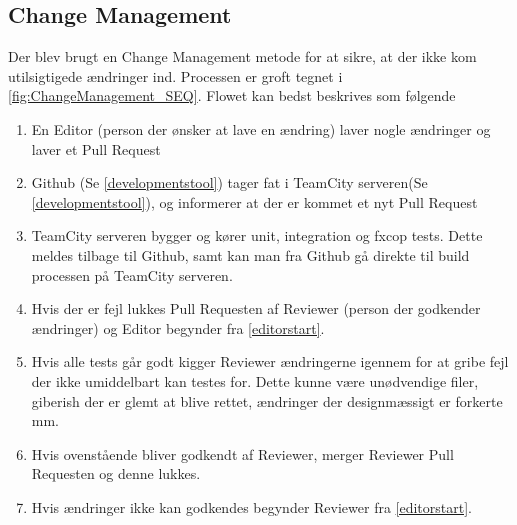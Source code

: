 \subsection{Change Management}
Der blev brugt en Change Management metode for at sikre, at der ikke kom utilsigtigede ændringer ind. Processen er groft tegnet i \ref{fig:ChangeManagement_SEQ}. Flowet kan bedst beskrives som følgende
\begin{enumerate}[label=\arabic{enumi}.,ref=\arabic{enumi}]
  \item \label{editorstart} En Editor (person der ønsker at lave en ændring) laver nogle ændringer og laver et Pull Request
  \item Github (Se \ref{developmentstool}) tager fat i TeamCity serveren(Se \ref{developmentstool}), og informerer at der er kommet et nyt Pull Request
  \item TeamCity serveren bygger og kører unit, integration og fxcop tests. Dette meldes tilbage til Github, samt kan man fra Github gå direkte til build processen på TeamCity serveren.
  \item Hvis der er fejl lukkes Pull Requesten af Reviewer (person der godkender ændringer) og Editor begynder fra \ref{editorstart}.
  \item Hvis alle tests går godt kigger Reviewer ændringerne igennem for at gribe fejl der ikke umiddelbart kan testes for. Dette kunne være unødvendige filer, giberish der er glemt at blive rettet, ændringer der designmæssigt er forkerte mm.
  \item Hvis ovenstående bliver godkendt af Reviewer, merger Reviewer Pull Requesten og denne lukkes.
  \item Hvis ændringer ikke kan godkendes begynder Reviewer fra \ref{editorstart}.
\end{enumerate}

